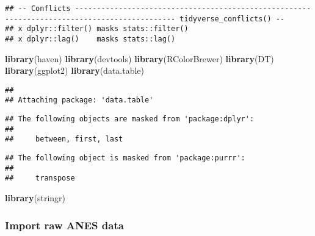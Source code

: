 \documentclass[
]{article}
\newenvironment{Shaded}{\begin{snugshade}}{\end{snugshade}}
\newcommand{\KeywordTok}[1]{\textcolor[rgb]{0.13,0.29,0.53}{\textbf{#1}}}
\newcommand{\NormalTok}[1]{#1}
\begin{document}
\begin{verbatim}
## -- Conflicts --------------------------------------------------------------------------------------------- tidyverse_conflicts() --
## x dplyr::filter() masks stats::filter()
## x dplyr::lag()    masks stats::lag()
\end{verbatim}

\begin{Shaded}
\begin{Highlighting}[]
\KeywordTok{library}\NormalTok{(haven)}
\KeywordTok{library}\NormalTok{(devtools)}
\KeywordTok{library}\NormalTok{(RColorBrewer)}
\KeywordTok{library}\NormalTok{(DT)}
\KeywordTok{library}\NormalTok{(ggplot2)}
\KeywordTok{library}\NormalTok{(data.table)}
\end{Highlighting}
\end{Shaded}

\begin{verbatim}
## 
## Attaching package: 'data.table'
\end{verbatim}

\begin{verbatim}
## The following objects are masked from 'package:dplyr':
## 
##     between, first, last
\end{verbatim}

\begin{verbatim}
## The following object is masked from 'package:purrr':
## 
##     transpose
\end{verbatim}

\begin{Shaded}
\begin{Highlighting}[]
\KeywordTok{library}\NormalTok{(stringr)}
\end{Highlighting}
\end{Shaded}

\hypertarget{import-raw-anes-data}{%
\subsubsection{Import raw ANES data}\label{import-raw-anes-data}}
\end{document}
